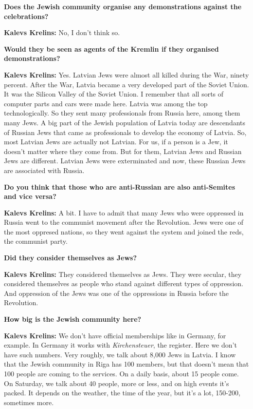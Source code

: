 \textbf{Does the Jewish community organise any demonstrations against the celebrations?} 

\textbf{Kalevs Krelins:} No, I don’t think so.  

\textbf{Would they be seen as agents of the Kremlin if they organised demonstrations?} 

\textbf{Kalevs Krelins:} Yes. Latvian Jews were almost all killed during the War, ninety percent. After the War, Latvia became a very developed part of the Soviet Union. It was the Silicon Valley of the Soviet Union. I remember that all sorts of computer parts and cars were made here. Latvia was among the top technologically. So they sent many professionals from Russia here, among them many Jews. A big part of the Jewish population of Latvia today are descendants of Russian Jews that came as professionals to develop the economy of Latvia. So, most Latvian Jews are actually not Latvian. For us, if a person is a Jew, it doesn't matter where they come from. But for them, Latvian Jews and Russian Jews are different. Latvian Jews were exterminated and now, these Russian Jews are associated with Russia.  

\textbf{Do you think that those who are anti-Russian are also anti-Semites and vice versa?} 

\textbf{Kalevs Krelins:} A bit. I have to admit that many Jews who were oppressed in Russia went to the communist movement after the Revolution. Jews were one of the most oppresed nations, so they went against the system and joined the reds, the communist party. 

\textbf{Did they consider themselves as Jews?} 

\textbf{Kalevs Krelins:} They considered themselves as Jews. They were secular, they considered themselves as people who stand against different types of oppression. And oppression of the Jews was one of the oppressions in Russia before the Revolution.   

\textbf{How big is the Jewish community here?} 

\textbf{Kalevs Krelins:} We don’t have official memberships like in Germany, for example. In Germany it works with \textit{Kirchensteuer}, the register. Here we don’t have such numbers. Very roughly, we talk about 8,000 Jews in Latvia. I know that the Jewish community in Riga has 100 members, but that doesn’t mean that 100 people are coming to the services. On a daily basis, about 15 people come. On Saturday, we talk about 40 people, more or less, and on high events it’s packed. It depends on the weather, the time of the year, but it’s a lot, 150-200, sometimes more.  

